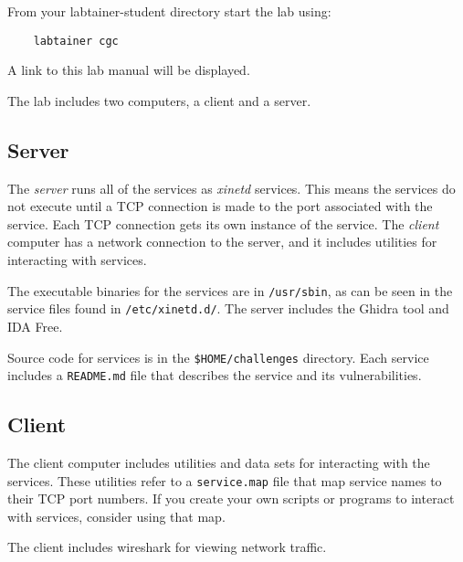 From your labtainer-student directory start the lab using:
\begin{verbatim}
    labtainer cgc
\end{verbatim}
\noindent A link to this lab manual will be displayed.  

The lab includes two computers, a client and a server.  
\subsection{Server}
The \textit{server} runs all of the services as \textit{xinetd}
services.  This means the services do not execute until a TCP connection is made to the port
associated with the service.  Each TCP connection gets its own instance of the service.  The
\textit{client} computer has a network connection to the server, and it includes utilities for
interacting with services.

The executable binaries for the services are in {\tt /usr/sbin}, as can be seen in the service
files found in {\tt /etc/xinetd.d/}.  The server includes the Ghidra tool and IDA Free.

Source code for services is in the {\tt \$HOME/challenges} directory.  Each service includes a
{\tt README.md} file that describes the service and its vulnerabilities.  

\subsection{Client}
The client computer includes utilities and data sets for interacting with the services.  
These utilities refer to a {\tt service.map} file that map service names to their TCP port numbers.
If you create your own scripts or programs to interact with services, consider using that map.

The client includes wireshark for viewing network traffic.

